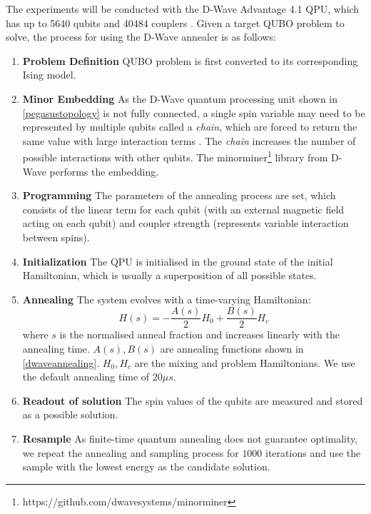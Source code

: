 The experiments will be conducted with the D-Wave Advantage 4.1 QPU, which has up to 5640 qubits and 40484 couplers \cite{dwaveadvantage}. Given a target QUBO problem to solve, the process for using the D-Wave annealer is as follows:
\begin{enumerate}
    \item \textbf{Problem Definition} QUBO problem is first converted to its corresponding Ising model.
    \item \textbf{Minor Embedding} As the D-Wave quantum processing unit shown in \autoref{pegasustopology} is not fully connected, a single spin variable may need to be represented by multiple qubits called a \textit{chain}, which are forced to return the same value with large interaction terms \cite{b16}. The \textit{chain} increases the number of possible interactions with other qubits. The minorminer\footnote{https://github.com/dwavesystems/minorminer} library from D-Wave performs the embedding.
    \item \textbf{Programming} The parameters of the annealing process are set, which consists of the linear term for each qubit (with an external magnetic field acting on each qubit) and coupler strength (represents variable interaction between spins).
    \item \textbf{Initialization} The QPU is initialised in the ground state of the initial Hamiltonian, which is usually a superposition of all possible states.
    \item \textbf{Annealing} The system evolves with a time-varying Hamiltonian:
    \begin{equation}
        \label{eqn:dwavehamiltonian}
        H(s) = -\frac{A(s)}{2}H_0 + \frac{B(s)}{2}H_c
    \end{equation}
    where $s$ is the normalised anneal fraction and increases linearly with the annealing time. $A(s), B(s)$ are annealing functions shown in \autoref{dwaveannealing}. $H_0, H_c$ are the mixing and problem Hamiltonians. We use the default annealing time of $20\mu s$.
    \item \textbf{Readout of solution} The spin values of the qubits are measured and stored as a possible solution.
    \item \textbf{Resample} As finite-time quantum annealing does not guarantee optimality, we repeat the annealing and sampling process for $1000$ iterations and use the sample with the lowest energy as the candidate solution.
\end{enumerate}


